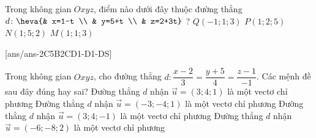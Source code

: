 \begin{ex}%
	Trong không gian $Oxyz$, điểm nào dưới đây thuộc đường thẳng $d \colon \heva{& x=1-t \\ & y=5+t \\ 	& z=2+3t}$ ?
	\choice
	{  $Q\left( -1; 1; 3 \right)$}
	{ $P\left( 1; 2; 5 \right)$}
	{\True $N\left( 1; 5;2 \right)$}
	{ $M\left( 1; 1; 3 \right)$}
\end{ex}
\TNTF
{}[ans/ans-2C5B2CD1-D1-DS]
\begin{ex}%
	Trong không gian $Oxyz$, cho đường thẳng $d \colon \dfrac{x-2}{3}=\dfrac{y+5}{4}=\dfrac{z-1}{-1}$.  Các mệnh đề sau đây đúng hay sai?
	\choiceTF
	{ Đường thẳng $d$ nhận $\overrightarrow{u}=\left( 3;4;1 \right)$ là một vectơ chỉ phương}
	{ \True Đường thẳng $d$ nhận $\overrightarrow{u}=\left( -3;-4;1 \right)$ là một vectơ chỉ phương}
	{\True  Đường thẳng $d$ nhận $\overrightarrow{u}=\left( 3;4;-1 \right)$ là một vectơ chỉ phương}
	{ \True Đường thẳng $d$ nhận $\overrightarrow{u}=\left( -6;-8;2 \right)$ là một vectơ chỉ phương}
\end{ex}
